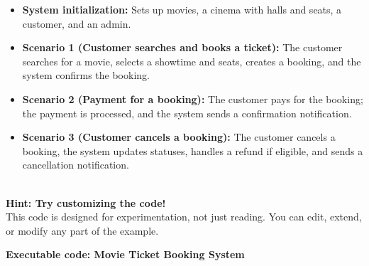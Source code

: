\begin{itemize}
\item
\protect{}\label{r1vGIRnM1Y3u2QaGqcOD_}
\textbf{System initialization:} Sets up movies, a cinema with halls and seats, a customer, and an admin.
\item
\protect{}\label{DrOu71z244kRG22_T5EgR}
\textbf{Scenario 1 (Customer searches and books a ticket):} The customer searches for a movie, selects a showtime and seats, creates a booking, and the system confirms the booking.
\item
\protect{}\label{jiK9pQa9HJy5Vd4mC3-OI}
\textbf{Scenario 2 (Payment for a booking):} The customer pays for the booking; the payment is processed, and the system sends a confirmation notification.
\item
\protect{}\label{khckOKPY60f3NdvqBY8p4}
\textbf{Scenario 3 (Customer cancels a booking):} The customer cancels a booking, the system updates statuses, handles a refund if eligible, and sends a cancellation notification.
\end{itemize}
\\
\textbf{Hint: Try customizing the code!}
\\
This code is designed for experimentation, not just reading. You can edit, extend, or modify any part of the example.

\textbf{Executable code: Movie Ticket Booking System}

